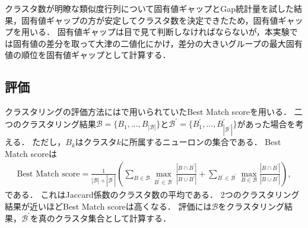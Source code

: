クラスタ数が明瞭な類似度行列について固有値ギャップとGap統計量を試した結果，固有値ギャップの方が安定してクラスタ数を決定できたため，固有値ギャップを用いる．
固有値ギャップは目で見て判断しなければならないが，本実験では固有値の差分を取って大津の二値化にかけ，差分の大きいグループの最大固有値の順位を固有値ギャップとして計算する．

\subsection{評価}
クラスタリングの評価方法には\cite{Molter2018}で用いられていたBest Match scoreを用いる．
二つのクラスタリング結果$\mathcal{B} = \{B_1, \dots, B_{|\mathcal{B}|}\}$と$\mathcal{B^\prime} = \{B^\prime_1, \dots, B^\prime_{|\mathcal{B}^\prime|}\}$があった場合を考える．
ただし，$B_k$はクラスタ$k$に所属するニューロンの集合である．
Best Match scoreは
\begin{align}
	\text{Best Match score} = \frac{1}{|\mathcal{B}| + |\mathcal{B^\prime}|} \left( \sum_{B \in \mathcal{B}} \max_{B^\prime \in \mathcal{B^\prime}} \frac{|B \cap B^\prime|}{|B \cup B^\prime|} + \sum_{B^\prime \in \mathcal{B^\prime}} \max_{B \in \mathcal{B}} \frac{|B \cap B^\prime|}{|B \cup B^\prime|} \right),
\end{align}
である．
これはJaccard係数のクラスタ数の平均である．
2つのクラスタリング結果が近いほどBest Match scoreは高くなる．
評価には$\mathcal{B}$をクラスタリング結果，$\mathcal{B}^\prime$を真のクラスタ集合として計算する．
